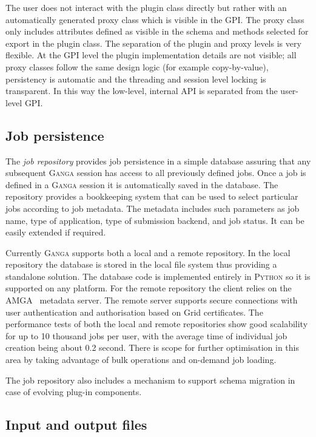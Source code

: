 \documentclass{elsart}
\def\ganga {\textsc{Ganga}\xspace}
\def\python {\textsc{Python}\xspace}
\def\grid {Grid\xspace}
\def\GPI{GPI\xspace}
\begin{document}
The user does not interact with the plugin class directly but rather with an
automatically generated proxy class which is visible in the \GPI. The proxy
class only includes attributes defined as visible in the schema and methods
selected for export in the plugin class. The separation of the plugin and
proxy levels is very flexible. At the \GPI level the plugin implementation
details are not visible; all proxy classes follow the same design logic (for
example copy-by-value), persistency is automatic and the threading and session
level locking is transparent. In this way the low-level, internal API is
separated from the user-level \GPI.

\subsection{Job persistence}
\label{sec:persistence}
The \emph{job repository} provides job persistence in a simple database
assuring that any subsequent \ganga session has access to all previously
defined jobs. Once a job is defined in a \ganga session it is automatically
saved in the database. The repository provides a bookkeeping system that can
be used to select particular jobs according to job metadata. The metadata
includes such parameters as job name, type of application, type of submission
backend, and job status. It can be easily extended if required.

Currently \ganga supports both a local and a remote repository. In the
local repository the database is stored in the local file system thus
providing a standalone solution. The database code is implemented
entirely in \python so it is supported on any platform. For the remote
repository the client relies on the AMGA~\cite{AMGA} metadata
server. The remote server supports secure connections with user
authentication and authorisation based on \grid certificates.  The
performance tests of both the local and remote repositories show good
scalability for up to 10 thousand jobs per user, with the average time
of individual job creation being about 0.2 second. There is scope for
further optimisation in this area by taking advantage of bulk
operations and on-demand job loading.

The job repository also includes a mechanism to support schema migration in
case of evolving plug-in components.

\subsection{Input and output files}
\end{document}
